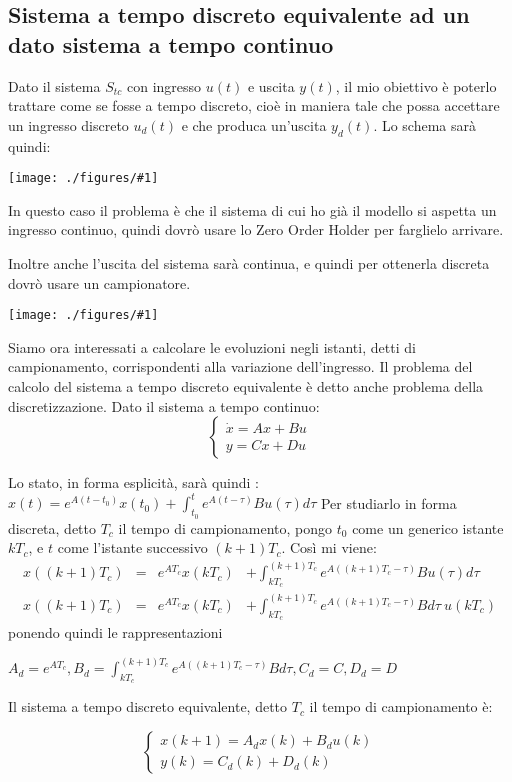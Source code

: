 \documentclass{article}
\newcommand{\incfig}[2]{%
	\texttt{[image: ./figures/\#1]}%
}
\begin{document}
\subsection{Sistema a tempo discreto equivalente ad un dato sistema a tempo continuo}
Dato il sistema $S_{tc}$ con ingresso $u(t)$ e uscita $y(t)$, il mio obiettivo è poterlo trattare come se fosse a tempo discreto, cioè in maniera tale
che possa accettare un ingresso discreto $u_d(t)$ e che produca un'uscita $y_d(t)$.
Lo schema sarà quindi:

\incfig{ZOH.jpeg}{0.4}

In questo caso il problema è che il sistema di cui ho già il modello si aspetta un ingresso continuo, quindi dovrò usare lo Zero Order Holder per
farglielo arrivare.

Inoltre anche l'uscita del sistema sarà continua, e quindi per ottenerla discreta dovrò usare un campionatore.

\incfig{discreto.jpeg}{0.4}

Siamo ora interessati a calcolare le evoluzioni negli istanti, detti di campionamento, corrispondenti alla variazione dell'ingresso.
Il problema del calcolo del sistema a tempo discreto equivalente è detto anche problema della discretizzazione. Dato il sistema a tempo continuo:
\[
\begin{cases}
    \dot{x} = Ax+Bu\\
    y = Cx+Du
\end{cases}
\]

Lo stato, in forma esplicità, sarà quindi : \(\displaystyle x(t) = e^{A(t-t_0)}x(t_0) + \int_{t_0}^{t} e^{A(t-\tau)}Bu(\tau)d\tau\)
Per studiarlo in forma discreta, detto $T_c$ il tempo di campionamento, pongo $t_0$ come un generico istante $kT_c$, e $t$ come l'istante successivo
$(k+1)T_c$. Così mi viene:
\begin{align*} 
    x((k+1)T_c) &=& e^{AT_c}x(kT_c) &+ \int_{kT_c}^{(k+1)T_c} e ^{A((k+1)T_c-\tau)}B u(\tau) d\tau \\
    x((k+1)T_c) &=& e^{AT_c}x(kT_c) &+ \int_{kT_c}^{(k+1)T_c} e ^{A((k+1)T_c-\tau)}B  d\tau \ u(kT_c)
\end{align*}
ponendo quindi le rappresentazioni 

\(\displaystyle A_d=e^{AT_c}, B_d=\int_{kT_c}^{(k+1)T_c} e^{A((k+1)T_c-\tau)}B d\tau , C_d = C,  D_d=D\)

Il sistema a tempo discreto equivalente, detto $T_c$ il tempo di campionamento è:

\[
\begin{cases}
    x(k+1)=A_d x(k)+B_d u(k)\\
    y(k)=C_d (k) + D_d(k)
\end{cases}
\]
\end{document}
